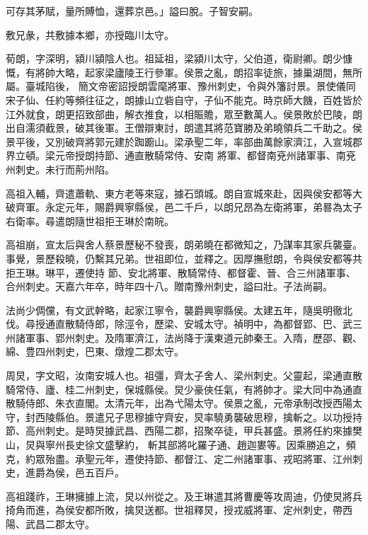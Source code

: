 \begin{pinyinscope}
 可存其茅賦，量所賻恤，還葬京邑。」謚曰脫。子智安嗣。



 敷兄彖，共敷據本鄉，亦授臨川太守。



 荀朗，字深明，潁川潁陰人也。祖延祖，梁潁川太守，父伯道，衛尉卿。朗少慷慨，有將帥大略，起家梁廬陵王行參軍。侯景之亂，朗招率徒旅，據巢湖間，無所屬。臺城陷後，
 簡文帝密詔授朗雲麾將軍、豫州刺史，令與外籓討景。景使儀同宋子仙、任約等頻往征之，朗據山立砦自守，子仙不能克。時京師大饑，百姓皆於江外就食，朗更招致部曲，解衣推食，以相賑贍，眾至數萬人。侯景敗於巴陵，朗出自濡須截景，破其後軍。王僧辯東討，朗遣其將范寶勝及弟曉領兵二千助之。侯景平後，又別破齊將郭元建於踟躕山。梁承聖二年，率部曲萬餘家濟江，入宣城郡界立頓。梁元帝授朗持節、通直散騎常侍、安南
 將軍、都督南兗州諸軍事、南兗州刺史。未行而荊州陷。



 高祖入輔，齊遣蕭軌、東方老等來寇，據石頭城。朗自宣城來赴，因與侯安都等大破齊軍。永定元年，賜爵興寧縣侯，邑二千戶，以朗兄昂為左衛將軍，弟晷為太子右衛率。尋遣朗隨世祖拒王琳於南皖。



 高祖崩，宣太后與舍人蔡景歷秘不發喪，朗弟曉在都微知之，乃謀率其家兵襲臺。事覺，景歷殺曉，仍繫其兄弟。世祖即位，並釋之。因厚撫慰朗，令與侯安都等共拒王琳。琳平，遷使持
 節、安北將軍、散騎常侍、都督霍、晉、合三州諸軍事、合州刺史。天嘉六年卒，時年四十八。贈南豫州刺史，謚曰壯。子法尚嗣。



 法尚少倜儻，有文武幹略，起家江寧令，襲爵興寧縣侯。太建五年，隨吳明徹北伐。尋授通直散騎侍郎，除涇令，歷梁、安城太守。禎明中，為都督郢、巴、武三州諸軍事、郢州刺史。及隋軍濟江，法尚降于漢東道元帥秦王。入隋，歷邵、觀、綿、豊四州刺史，巴東、燉煌二郡太守。



 周炅，字文昭，汝南安城人也。祖彊，齊太子舍人、梁州刺史。父靈起，梁通直散騎常侍、廬、桂二州刺史，保城縣侯。炅少豪俠任氣，有將帥才。梁大同中為通直散騎侍郎、朱衣直閣。太清元年，出為弋陽太守。侯景之亂，元帝承制改授西陽太守，封西陵縣伯。景遣兄子思穆據守齊安，炅率驍勇襲破思穆，擒斬之。以功授持節、高州刺史。是時炅據武昌、西陽二郡，招聚卒徒，甲兵甚盛。景將任約來據樊山，炅與寧州長史徐文盛擊約，
 斬其部將叱羅子通、趙迦婁等。因乘勝追之，頻克，約眾殆盡。承聖元年，遷使持節、都督江、定二州諸軍事、戎昭將軍、江州刺史，進爵為侯，邑五百戶。



 高祖踐祚，王琳擁據上流，炅以州從之。及王琳遣其將曹慶等攻周迪，仍使炅將兵掎角而進，為侯安都所敗，擒炅送都。世祖釋炅，授戎威將軍、定州刺史，帶西陽、武昌二郡太守。




\end{pinyinscope}

